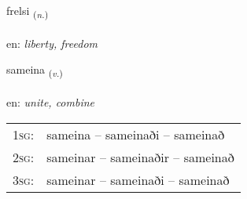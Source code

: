 \documentclass[frontgrid, backgrid]{flacards}\usepackage[]{graphicx}\usepackage[]{color}
\begin{document}
\renewcommand{\flhead}{\vskip5pt \fboxsep=0pt {\small\bfseries\footnotesize Nafnorð | Noun}}
\renewcommand{\fcfoot}{\vskip5pt \fboxsep=0pt \hspace{2pt}{\small\bfseries\footnotesize 2K}}

\renewcommand{\blhead}{\vskip5pt {\small\bfseries\footnotesize Nafnorð | Noun }}
\renewcommand{\bcfoot}{\vskip5pt \hspace{2pt}{\small\bfseries\footnotesize 2K}}


{frelsi \small{\textsubscript{(\textit{n.})}} \\[1ex] %
\textphonetic{[frɛlsɪ]} \\
en: \emph{liberty, freedom} \\  [2ex]
\renewcommand*{\arraystretch}{0.8}
}

\renewcommand{\flhead}{\vskip5pt \fboxsep=0pt {\small\bfseries\footnotesize Sagnorð | Verb}}
\renewcommand{\fcfoot}{\vskip5pt \fboxsep=0pt \hspace{2pt}{\small\bfseries\footnotesize 2K}}

\renewcommand{\blhead}{\vskip5pt {\small\bfseries\footnotesize Sagnorð | Verb }}
\renewcommand{\bcfoot}{\vskip5pt \hspace{2pt}{\small\bfseries\footnotesize 2K}}


{sameina \small{\textsubscript{(\textit{v.})}} \\[1ex] %
\textphonetic{[saːmeina]} \\
en: \emph{unite, combine} \\  [2ex]
\renewcommand*{\arraystretch}{0.8}
\begin{tabular}{p{1cm}l}
\textsc{1sg}: & sameina -- sameinaði -- sameinað \\ 
\textsc{2sg}: & sameinar -- sameinaðir -- sameinað \\ 
\textsc{3sg}: & sameinar -- sameinaði -- sameinað \\ 
\end{tabular}
}
\end{document}
